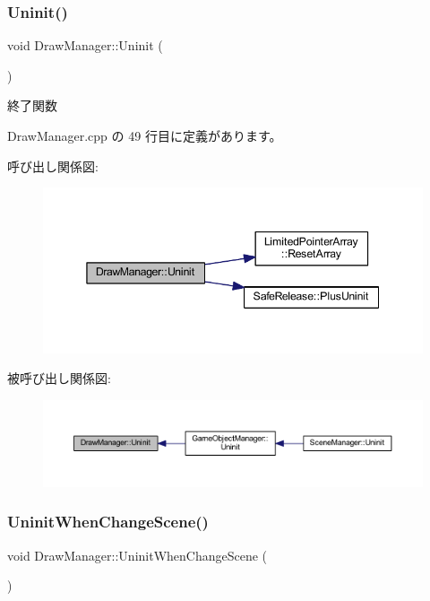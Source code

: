 \subsubsection{\texorpdfstring{Uninit()}{Uninit()}}
{\footnotesize\ttfamily void Draw\+Manager\+::\+Uninit (\begin{DoxyParamCaption}{ }\end{DoxyParamCaption})}



終了関数 



 Draw\+Manager.\+cpp の 49 行目に定義があります。

呼び出し関係図\+:
\nopagebreak
\begin{figure}[H]
\begin{center}
\leavevmode
\includegraphics[width=345pt]{class_draw_manager_ae58095d9d734f30211011e9205aa57aa_cgraph}
\end{center}
\end{figure}
被呼び出し関係図\+:
\nopagebreak
\begin{figure}[H]
\begin{center}
\leavevmode
\includegraphics[width=350pt]{class_draw_manager_ae58095d9d734f30211011e9205aa57aa_icgraph}
\end{center}
\end{figure}
\mbox{\label{class_draw_manager_a8b4ea38d625efbcc08d9b168cb5465f9}} 
\subsubsection{\texorpdfstring{Uninit\+When\+Change\+Scene()}{UninitWhenChangeScene()}}
{\footnotesize\ttfamily void Draw\+Manager\+::\+Uninit\+When\+Change\+Scene (\begin{DoxyParamCaption}{ }\end{DoxyParamCaption})}



